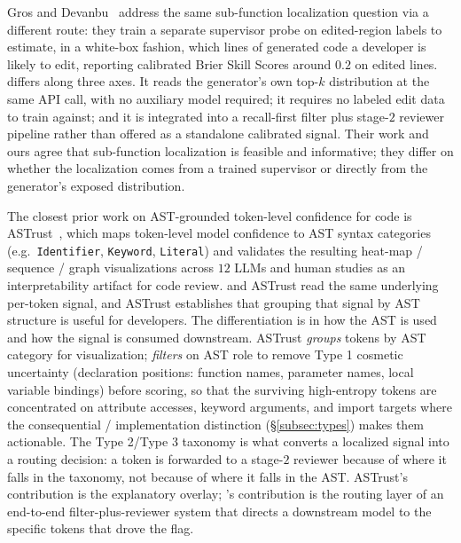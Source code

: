 Gros and Devanbu~\cite{gros2025localized} address the same
sub-function localization question via a different route: they train a
separate supervisor probe on edited-region labels to estimate, in a
white-box fashion, which lines of generated code a developer is likely
to edit, reporting calibrated Brier Skill Scores around $0.2$ on edited
lines. \eps differs along three axes. It reads the generator's own
top-$k$ distribution at the same API call, with no auxiliary model
required; it requires no labeled edit data to train against; and it is
integrated into a recall-first filter plus stage-$2$ reviewer pipeline
rather than offered as a standalone calibrated signal. Their work and
ours agree that sub-function localization is feasible and informative;
they differ on whether the localization comes from a trained supervisor
or directly from the generator's exposed distribution.

The closest prior work on AST-grounded token-level confidence for code
is ASTrust~\cite{palacio2024astrust}, which maps token-level model
confidence to AST syntax categories (e.g.\ \texttt{Identifier},
\texttt{Keyword}, \texttt{Literal}) and validates the resulting
heat-map / sequence / graph visualizations across $12$ LLMs and human
studies as an interpretability artifact for code review. \eps and
ASTrust read the same underlying per-token signal, and ASTrust
establishes that grouping that signal by AST structure is useful for
developers. The differentiation is in how the AST is used and how the
signal is consumed downstream. ASTrust \emph{groups} tokens by AST
category for visualization; \eps \emph{filters} on AST role to remove
Type 1 cosmetic uncertainty (declaration positions: function names,
parameter names, local variable bindings) before scoring, so that the
surviving high-entropy tokens are concentrated on attribute accesses,
keyword arguments, and import targets where the consequential /
implementation distinction (\S\ref{subsec:types}) makes them
actionable. The Type 2/Type 3 taxonomy is what converts a localized
signal into a routing decision: a token is forwarded to a stage-$2$
reviewer because of where it falls in the taxonomy, not because of
where it falls in the AST. ASTrust's contribution is the explanatory
overlay; \eps's contribution is the routing layer of an end-to-end
filter-plus-reviewer system that directs a downstream model to the
specific tokens that drove the flag.

